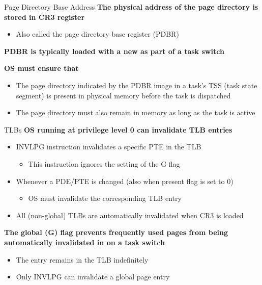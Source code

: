 \documentclass[aspectratio=169,12pt]{beamer}
\begin{document}
\begin{frame}{Page Directory Base Address}
\textbf{The physical address of the page directory is stored in CR3 register}
\begin{itemize}
\item Also called the page directory base register (PDBR)
\end{itemize}

\textbf{PDBR is typically loaded with a new as part of a task switch}

\textbf{OS must ensure that}
\begin{itemize}
\item The page directory indicated by the PDBR image in a task's TSS (task state segment) is present in physical memory before the task is dispatched
\item The page directory must also remain in memory as long as the task is active
\end{itemize}
\end{frame}

\begin{frame}{TLBs}
\textbf{OS running at privilege level 0 can invalidate TLB entries}
\begin{itemize}
\item INVLPG instruction invalidates a specific PTE in the TLB
    \begin{itemize}
    \item This instruction ignores the setting of the G flag
    \end{itemize}
\item Whenever a PDE/PTE is changed (also when present flag is set to 0)
    \begin{itemize}
    \item OS must invalidate the corresponding TLB entry
    \end{itemize}
\item All (non-global) TLBs are automatically invalidated when CR3 is loaded
\end{itemize}

\textbf{The global (G) flag prevents frequently used pages from being automatically invalidated in on a task switch}
\begin{itemize}
\item The entry remains in the TLB indefinitely
\item Only INVLPG can invalidate a global page entry
\end{itemize}
\end{frame}
\end{document}
